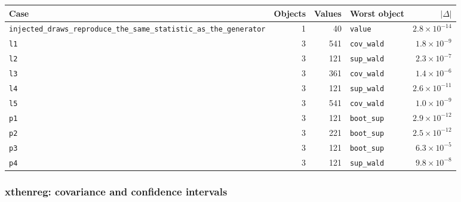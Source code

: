 \begin{longtable}{@{}p{3.6cm}rrp{4.9cm}r@{}}
\toprule
Case & Objects & Values & Worst object & $|\Delta|$ \\
\midrule
\endhead
\texttt{injected\_\allowbreak{}draws\_\allowbreak{}reproduce\_\allowbreak{}the\_\allowbreak{}same\_\allowbreak{}statistic\_\allowbreak{}as\_\allowbreak{}the\_\allowbreak{}generator} & 1 & 40 & \texttt{value} & $2.8\times10^{-14}$ \\
\texttt{l1} & 3 & 541 & \texttt{cov\_\allowbreak{}wald} & $1.8\times10^{-9}$ \\
\texttt{l2} & 3 & 121 & \texttt{sup\_\allowbreak{}wald} & $2.3\times10^{-7}$ \\
\texttt{l3} & 3 & 361 & \texttt{cov\_\allowbreak{}wald} & $1.4\times10^{-6}$ \\
\texttt{l4} & 3 & 121 & \texttt{sup\_\allowbreak{}wald} & $2.6\times10^{-11}$ \\
\texttt{l5} & 3 & 541 & \texttt{cov\_\allowbreak{}wald} & $1.0\times10^{-9}$ \\
\texttt{p1} & 3 & 121 & \texttt{boot\_\allowbreak{}sup} & $2.9\times10^{-12}$ \\
\texttt{p2} & 3 & 221 & \texttt{boot\_\allowbreak{}sup} & $2.5\times10^{-12}$ \\
\texttt{p3} & 3 & 121 & \texttt{boot\_\allowbreak{}sup} & $6.3\times10^{-5}$ \\
\texttt{p4} & 3 & 121 & \texttt{sup\_\allowbreak{}wald} & $9.8\times10^{-8}$ \\
\bottomrule
\end{longtable}

\subsubsection*{xthenreg: covariance and confidence intervals}


